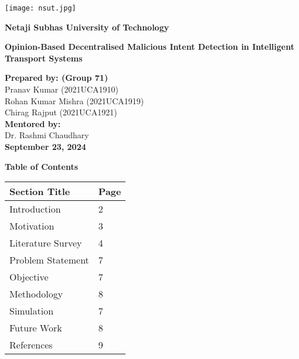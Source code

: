 \documentclass[a4paper,14pt]{extarticle}
\begin{document}
\begin{titlepage}
    \centering
    \texttt{[image: nsut.jpg]} %
    \vfill
    {\LARGE \textbf{Netaji Subhas University of Technology} \par}
    \vspace{1cm}
    {\large \textbf{Opinion-Based Decentralised Malicious Intent Detection in Intelligent Transport Systems} \par}
    \vspace{1cm}
    \textbf{Prepared by: (Group 71)} \\
    Pranav Kumar (2021UCA1910) \\
    Rohan Kumar Mishra (2021UCA1919) \\
    Chirag Rajput (2021UCA1921) \\
    \vspace{1cm}
    \textbf{Mentored by:} \\
    Dr. Rashmi Chaudhary \\
    \vspace{2cm}
    {\textbf{September 23, 2024}} %
    \vfill
\end{titlepage}

\newpage
\begin{center}
    {\Huge \textbf{Table of Contents}} \\
    \vspace{1cm}
\end{center}

\begin{longtable}{|p{}|p{}|}
    \hline
    \textbf{Section Title} & \textbf{Page} \\
    \hline
    Introduction & 2 \\
    \hline
    Motivation & 3 \\
    \hline
    Literature Survey & 4 \\
    \hline
    Problem Statement & 7 \\
    \hline
    Objective & 7 \\
    \hline
    Methodology & 8 \\
    \hline
    Simulation & 7 \\
    \hline
    Future Work & 8 \\
    \hline
    References & 9 \\
    \hline
    
\end{longtable}
\end{document}
